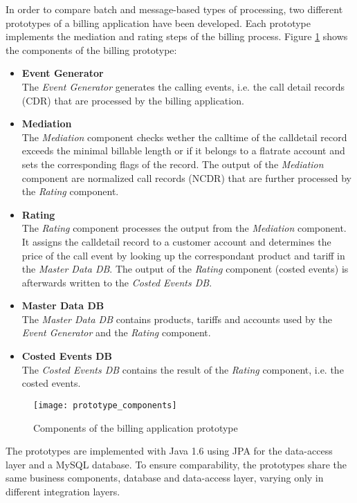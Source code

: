 In order to compare batch and message-based types of processing, two different prototypes of a billing application have been developed. Each prototype implements the mediation and rating steps of the billing process. Figure \ref{fig:prototype_components} shows the components of the billing prototype: 
\begin{itemize}
	\item \textbf{Event Generator}\\
	The \emph{Event Generator} generates the calling events, i.e. the call detail records (CDR) that are processed by the billing application.
	\item \textbf{Mediation}\\
	The \emph{Mediation} component checks wether the calltime of the calldetail record exceeds the minimal billable length or if it belongs to a flatrate account and sets the corresponding flags of the record. The output of the \emph{Mediation} component are normalized call records (NCDR) that are further processed by the \emph{Rating} component.
	\item \textbf{Rating}\\
	The \emph{Rating} component processes the output from the \emph{Mediation} component. It assigns the calldetail record to a customer account and determines the price of the call event by looking up the correspondant product and tariff in the \emph{Master Data DB}. The output of the \emph{Rating} component (costed events) is afterwards written to the \emph{Costed Events DB}.
	\item \textbf{Master Data DB}\\
	The \emph{Master Data DB} contains products, tariffs and accounts used by the \emph{Event Generator} and the \emph{Rating} component.
	\item \textbf{Costed Events DB}\\
	The \emph{Costed Events DB} contains the result of the \emph{Rating} component, i.e. the costed events.
\end{itemize}

\begin{figure}[h!]
	\centering
	\texttt{[image: prototype\_components]}
	\caption{Components of the billing application prototype}
	\label{fig:prototype_components}
\end{figure}

The prototypes are implemented with Java 1.6 using JPA for the data-access layer and a MySQL database. To ensure comparability, the prototypes share the same business components, database and data-access layer, varying only in different integration layers. 

